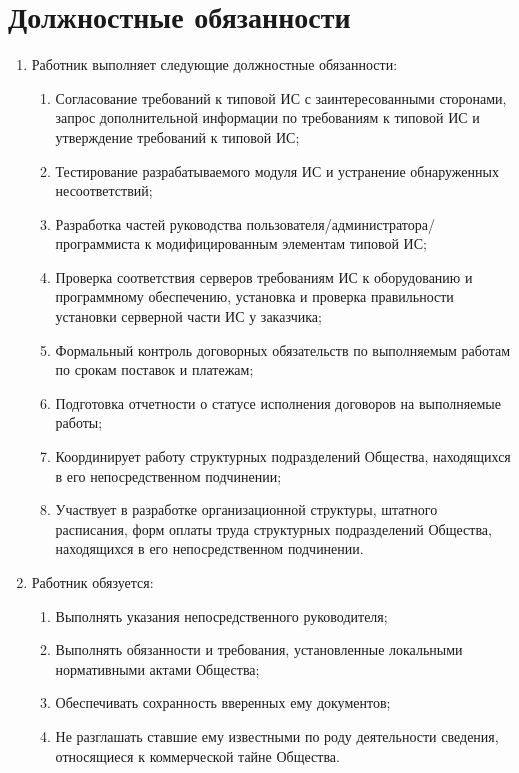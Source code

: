 \documentclass[a4paper, 12pt, twoside]{article}
\begin{document}
\section{Должностные обязанности}
\begin{enumerate}[label=2.\arabic*.]
  \item Работник выполняет следующие должностные обязанности:
  \begin{enumerate}[label=2.1.\arabic*.]
    \item Согласование требований к типовой ИС с заинтересованными сторонами, запрос дополнительной информации по требованиям к типовой ИС и утверждение требований к типовой ИС;
    \item Тестирование разрабатываемого модуля ИС и устранение обнаруженных несоответствий;
    \item Разработка частей руководства пользователя/администратора/программиста к модифицированным элементам типовой ИС;
    \item Проверка соответствия серверов требованиям ИС к оборудованию и программному обеспечению, установка и проверка правильности установки серверной части ИС у заказчика;
    \item Формальный контроль договорных обязательств по выполняемым работам по срокам поставок и платежам;
    \item Подготовка отчетности о статусе исполнения договоров на выполняемые работы;
    \item Координирует работу структурных подразделений Общества, находящихся в его непосредственном подчинении;
    \item Участвует в разработке организационной структуры, штатного расписания, форм оплаты труда структурных подразделений Общества, находящихся в его непосредственном подчинении.
  \end{enumerate}
  \item Работник обязуется:
  \begin{enumerate}[label=2.2.\arabic*.]
    \item Выполнять указания непосредственного руководителя;
    \item Выполнять обязанности и требования, установленные локальными нормативными актами Общества;
    \item Обеспечивать сохранность вверенных ему документов;
    \item Не разглашать ставшие ему известными по роду деятельности сведения, относящиеся к коммерческой тайне Общества.
  \end{enumerate}
\end{enumerate}
\end{document}
